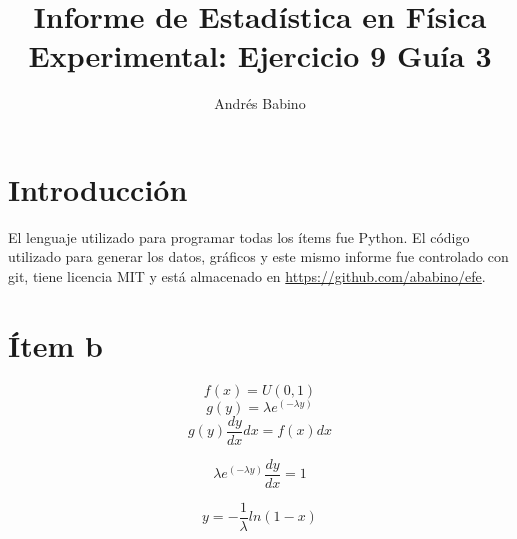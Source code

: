 \documentclass{article}
\title{Informe de Estadística en Física Experimental: Ejercicio 9 Guía 3}
\author{Andr\'es Babino}
\begin{document}
\maketitle
\section{Introducción}
El lenguaje utilizado para programar todas los ítems fue Python.
El código utilizado para generar los datos, gráficos y este mismo informe fue controlado con git, tiene licencia MIT y está almacenado en \url{https://github.com/ababino/efe}.

\section{Ítem b}
$$f (x) = U(0, 1)$$
$$ g(y) = \lambda e^(-\lambda y)$$
$$g(y) \frac{dy}{dx} dx= f(x) dx $$

$$\lambda e^(-\lambda y) \frac{dy}{dx} = 1 $$

$$ y = -\frac{1}{\lambda} ln(1-x)$$


\end{document}
